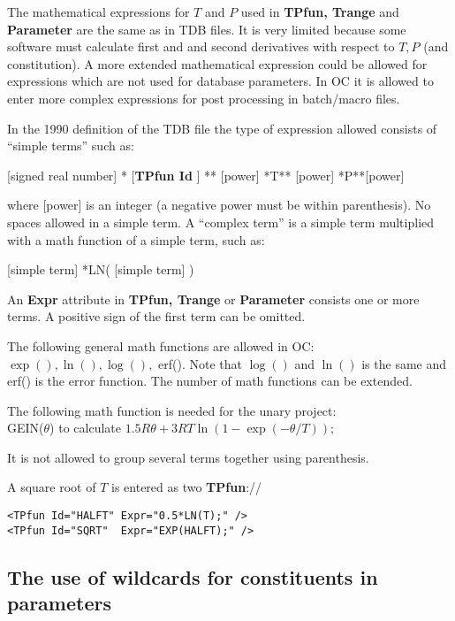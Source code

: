 \documentclass{article}
\begin{document}
The mathematical expressions for $T$ and $P$ used in {\bf TPfun,
  Trange} and {\bf Parameter} are the same as in TDB files.  It is
very limited because some software must calculate first and and second
derivatives with respect to $T, P$ (and constitution).  A more
extended mathematical expression could be allowed for expressions
which are not used for database parameters.  In OC it is allowed to
enter more complex expressions for post processing in batch/macro
files.

In the 1990 definition of the TDB file the type of expression allowed
consists of ``simple terms'' such as:

[signed real number] * [{\bf TPfun Id} ] ** [power] *T** [power] *P**[power]

where [power] is an integer (a negative power must be within
parenthesis).  No spaces allowed in a simple term.  A ``complex term''
is a simple term multiplied with a math function of a simple term,
such as:

[simple term] *LN( [simple term] )

An {\bf Expr} attribute in {\bf TPfun, Trange} or {\bf Parameter}
consists one or more terms.  A positive sign of the first term can be
omitted.
  
The following general math functions are allowed in OC:\\ $\exp(),
\ln(), \log(),$ erf().  Note that $\log()$ and $\ln()$ is the same and
erf() is the error function.  The number of math functions can be
extended.

The following math function is needed for the unary
project:\\ GEIN($\theta$) to calculate
$1.5R\theta+3RT\ln(1-\exp(-\theta/T));$

It is not allowed to group several terms together using parenthesis.

A square root of $T$ is entered as two {\bf TPfun}://
\begin{verbatim}
<TPfun Id="HALFT" Expr="0.5*LN(T);" />
<TPfun Id="SQRT"  Expr="EXP(HALFT);" />
\end{verbatim}

\subsection{The use of wildcards for constituents in parameters}\label{sec:wildcard}
\end{document}

